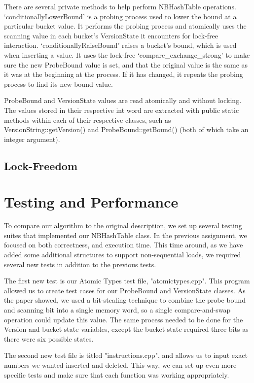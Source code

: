 \documentclass[journal]{IEEEtran}
\begin{document}
There are several private methods to help perform NBHashTable operations. ‘conditionallyLowerBound’ is a probing process used to lower the bound at a particular bucket value. It performs the probing process and atomically uses the scanning value in each bucket’s VersionState it encounters for lock-free interaction. ‘conditionallyRaiseBound’ raises a bucket’s bound, which is used when inserting a value. It uses the lock-free ‘compare\_exchange\_strong’ to make sure the new ProbeBound value is set, and that the original value is the same as it was at the beginning at the process. If it has changed, it repeats the probing process to find its new bound value.

ProbeBound and VersionState values are read atomically and without locking. The values stored in their respective int word are extracted with public static methods within each of their respective classes, such as VersionString::getVersion() and ProbeBound::getBound() (both of which take an integer argument).

\subsection{Lock-Freedom}

\section{Testing and Performance}

To compare our algorithm to the original description, we set up several testing suites that implemented our NBHashTable class. In the previous assignment, we focused on both correctness, and execution time. This time around, as we have added some additional structures to support non-sequential loads, we required several new tests in addition to the previous tests.

The first new test is our Atomic Types test file, "atomictypes.cpp". This program allowed us to create test cases for our ProbeBound and VersionState classes. As the paper showed, we used a bit-stealing technique to combine the probe bound and scanning bit into a single memory word, so a single compare-and-swap operation could update this value. The same process needed to be done for the Version and bucket state variables, except the bucket state required three bits as there were six possible states.

The second new test file is titled "instructions.cpp", and allows us to input exact numbers we wanted inserted and deleted. This way, we can set up even more specific tests and make sure that each function was working appropriately.
\end{document}
